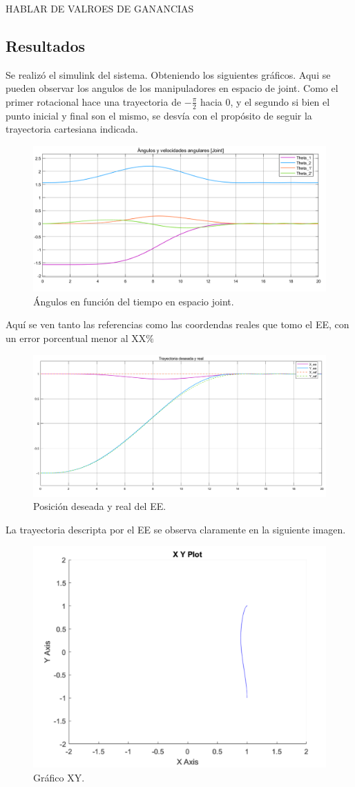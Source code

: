 HABLAR DE VALROES DE GANANCIAS

\subsection{Resultados}
Se realiz\'o el simulink del sistema. Obteniendo los siguientes gr\'aficos.
Aqui se pueden observar los angulos de los manipuladores en espacio de joint.
Como el primer rotacional hace una trayectoria de $-\frac{\pi}{2}$ hacia 0, y el segundo si bien el punto inicial y final son el mismo, se desv\'ia con el prop\'osito de seguir la trayectoria cartesiana indicada.
\begin{figure}[H]
	\centering
	\includegraphics[width=0.8\linewidth]{ImagenesControl de posición no lineal/1_3_a}
	\caption{\'Angulos en funci\'on del tiempo en espacio joint.}	
	\label{fig:athetas}
\end{figure}
Aqu\'i se ven tanto las referencias como las coordendas reales que tomo el EE, con un error porcentual menor al XX$\%$ 
\begin{figure}[H]
	\centering
	\includegraphics[width=0.8\linewidth]{ImagenesControl de posición no lineal/1_3_b}
	\caption{Posici\'on deseada y real del EE.}	
	\label{fig:apos}
\end{figure}

La trayectoria descripta por el EE se observa claramente en la siguiente imagen.
\begin{figure}[H]
	\centering
	\includegraphics[width=0.5\linewidth]{ImagenesControl de posición no lineal/1_3_c}
	\caption{Gr\'afico XY.}	
	\label{fig:axy}
\end{figure}

